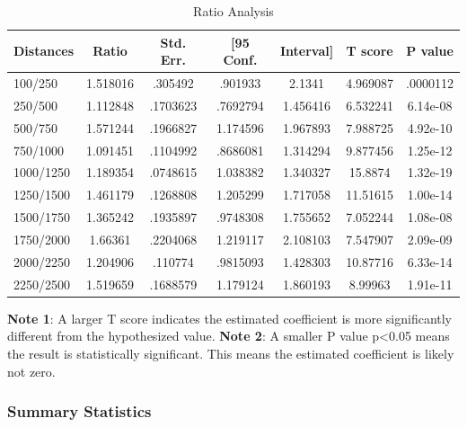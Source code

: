 \documentclass[12pt]{article}
\begin{document}
\begin{table}[h]
\centering
\caption{Ratio Analysis}
\begin{tabular}{l|c|c|cc|c|c}
\hline\hline
Distances   &       Ratio&   Std. Err.&  [95 Conf.&   Interval]&     T score&     P value\\
\hline
100/250     &    1.518016&     .305492&     .901933&      2.1341&    4.969087&    .0000112\\
250/500     &    1.112848&    .1703623&    .7692794&    1.456416&    6.532241&    6.14e-08\\
500/750     &    1.571244&    .1966827&    1.174596&    1.967893&    7.988725&    4.92e-10\\
750/1000    &    1.091451&    .1104992&    .8686081&    1.314294&    9.877456&    1.25e-12\\
1000/1250   &    1.189354&    .0748615&    1.038382&    1.340327&     15.8874&    1.32e-19\\
1250/1500   &    1.461179&    .1268808&    1.205299&    1.717058&    11.51615&    1.00e-14\\
1500/1750   &    1.365242&    .1935897&    .9748308&    1.755652&    7.052244&    1.08e-08\\
1750/2000   &     1.66361&    .2204068&    1.219117&    2.108103&    7.547907&    2.09e-09\\
2000/2250   &    1.204906&     .110774&    .9815093&    1.428303&    10.87716&    6.33e-14\\
2250/2500  &    1.519659&    .1688579&    1.179124&    1.860193&     8.99963&    1.91e-11\\
\hline\hline
\end{tabular}
\flushleft
\begin{footnotesize}
\begin{singlespace}
\textbf{Note 1}: A larger T score indicates the estimated coefficient is more significantly different from the hypothesized value.
\textbf{Note 2}: A smaller P value p<0.05 means the result is statistically significant. This means the estimated coefficient is likely not zero.
\end{singlespace}
\end{footnotesize}
\end{table}

\subsubsection{Summary Statistics}
\end{document}
